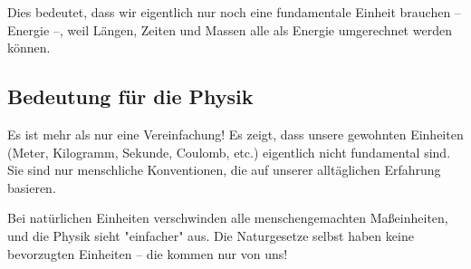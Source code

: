 \documentclass{article}
\begin{document}
	Dies bedeutet, dass wir eigentlich nur noch eine fundamentale Einheit brauchen – Energie –, weil Längen, Zeiten und Massen alle als Energie umgerechnet werden können.
	
	\subsection{Bedeutung für die Physik}
	Es ist mehr als nur eine Vereinfachung! Es zeigt, dass unsere gewohnten Einheiten (Meter, Kilogramm, Sekunde, Coulomb, etc.) eigentlich nicht fundamental sind. Sie sind nur menschliche Konventionen, die auf unserer alltäglichen Erfahrung basieren.
	
	Bei natürlichen Einheiten verschwinden alle menschengemachten Maßeinheiten, und die Physik sieht "einfacher" aus. Die Naturgesetze selbst haben keine bevorzugten Einheiten – die kommen nur von uns!
	
\end{document}
